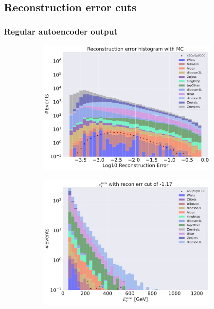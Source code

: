 \subsection*{Reconstruction error cuts}

\subsubsection*{Regular autoencoder output}
\begin{figure}[H]
    \centering
    \begin{subfigure}{.49\textwidth}
        \includegraphics[width=\textwidth]{Figures/AE_testing/big/3lep/b_data_recon_big_rm3_feats_sig_450p0p0300.pdf}
        \caption{ }
        \label{fig:AE_3lep_big_450_2}
    \end{subfigure}
    \hfill
    \begin{subfigure}{.49\textwidth}
        \includegraphics[width=\textwidth]{Figures/AE_testing/big/3lep/b_data_recon_big_rm3_feats_sig_450p0p0300_etmiss_recon_errcut_-1.17.pdf}

\end{subfigure}
\end{figure}
